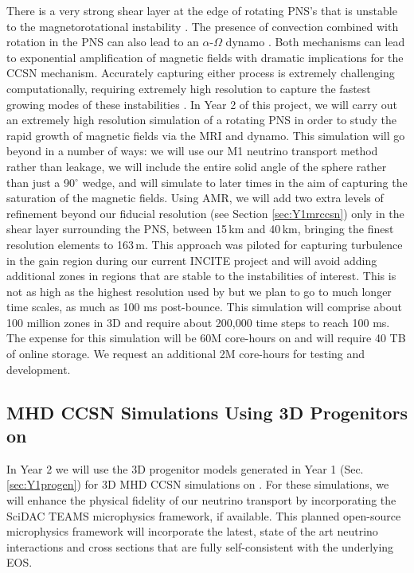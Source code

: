 There is a very strong shear layer at the edge of rotating PNS's that is unstable to the magnetorotational instability \citep[MRI,][]{Akiyama:2003, Burrows:2007}.
The presence of convection combined with rotation in the PNS can also lead to an $\alpha$-$\Omega$ dynamo \citep{Mosta:2015}.
Both mechanisms can lead to exponential amplification of magnetic fields with dramatic implications for the CCSN mechanism.
Accurately capturing either process is extremely challenging computationally, requiring extremely high resolution to capture the fastest growing modes of these instabilities \citep{Mosta:2015}.
In Year 2 of this project, we will carry out an extremely high resolution simulation of a rotating PNS in order to study the rapid growth of magnetic fields via the MRI and dynamo.
This simulation will go beyond \citet{Mosta:2015} in a number of ways: we will use our M1 neutrino transport method rather than leakage, we will include the entire solid angle of the sphere rather than just a 90$^\circ$ wedge, and will simulate to later times in the aim of capturing the saturation of the magnetic fields.
Using AMR, we will add two extra levels of refinement beyond our fiducial resolution (see Section \ref{sec:Y1mrccsn}) only in the shear layer surrounding the PNS, between 15\,km and 40\,km, bringing the finest resolution elements to 163\,m.
This approach was piloted for capturing turbulence in the gain region during our current INCITE project and will avoid adding additional zones in regions that are stable to the instabilities of interest.
This is not as high as the highest resolution used by \citet{Mosta:2015} but we plan to go to much longer time scales, as much as 100 ms post-bounce.
This simulation will comprise about 100 million zones in 3D and require about 200,000 time steps to reach 100 ms.
The expense for this simulation will be 60M core-hours on \mira and will require 40 TB of online storage. We request an additional 2M core-hours for testing and development.

\subsection{MHD CCSN Simulations Using 3D Progenitors on \thet}
\label{sec:Y2thet}

In Year 2 we will use the 3D progenitor models generated in Year 1 (Sec. \ref{sec:Y1progen}) for 3D MHD CCSN simulations on \thet.
For these simulations, we will enhance the physical fidelity of our neutrino transport by incorporating the SciDAC TEAMS microphysics framework, if available.
This planned open-source microphysics framework will incorporate the latest, state of the art neutrino interactions and cross sections that are fully self-consistent with the underlying EOS.

